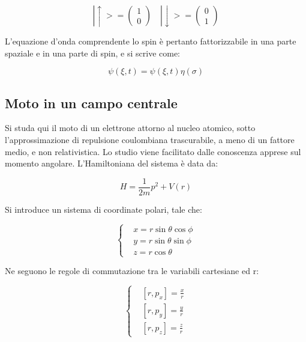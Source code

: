 \documentclass{article}
\begin{document}
\begin{equation}
    |\uparrow>=\begin{pmatrix}
        1 \\
        0
    \end{pmatrix}
    \quad
    |\downarrow>=\begin{pmatrix}
        0 \\
        1
    \end{pmatrix}
\end{equation}

L'equazione d'onda comprendente lo spin è pertanto fattorizzabile in una parte spaziale e in una parte di spin, e si scrive come:

\begin{equation}
    \psi(\xi, t)=\psi(\xi, t) \eta(\sigma)
\end{equation}

\subsection{Moto in un campo centrale}
Si studa qui il moto di un elettrone attorno al nucleo atomico, sotto l'approssimazione di repulsione coulombiana trascurabile, a meno di un fattore medio, e non relativistica.
Lo studio viene facilitato dalle conoscenza apprese sul momento angolare.
L'Hamiltoniana del sistema è data da:

\begin{equation}
    H=\frac{1}{2m}p^2+V(r)
\end{equation}

Si introduce un sistema di coordinate polari, tale che:

\begin{equation}
    \left\{
    \begin{aligned}
         & x=r\sin{\theta}\cos{\phi} \\
         & y=r\sin{\theta}\sin{\phi} \\
         & z=r\cos{\theta}
    \end{aligned}
    \right.
\end{equation}

Ne seguono le regole di commutazione tra le variabili cartesiane ed r:

\begin{equation}
    \left\{
    \begin{aligned}
         & [r, p_x]=\frac{x}{r} \\
         & [r, p_y]=\frac{y}{r} \\
         & [r, p_z]=\frac{z}{r}
    \end{aligned}
    \right.
\end{equation}
\end{document}
